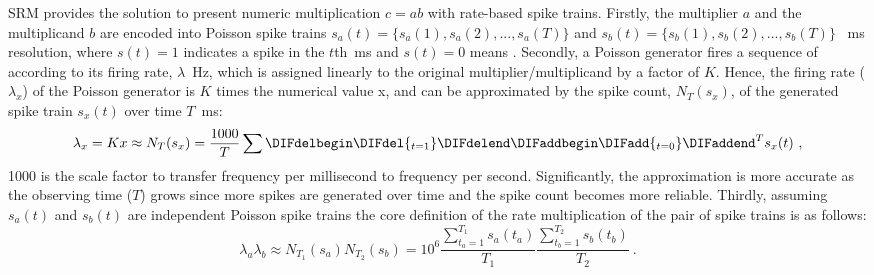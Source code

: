 SRM provides the solution to present numeric multiplication $c=ab$ with rate-based spike trains.
Firstly, the multiplier $a$ and the multiplicand $b$ are encoded into Poisson spike trains $s_a(t)=\{s_a(1),s_a(2),...,s_a(T)\}$ and $s_b(t)=\{s_b(1),s_b(2),...,s_b(T)\}$ \DIFdelbegin {}\DIFdelend \DIFaddbegin {}~ms resolution, where $s(t)=1$ indicates a spike in the $t$th~ms and $s(t)=0$ means \DIFdelbegin {}\DIFdelend \DIFaddbegin {}\DIFaddend .
Secondly, a Poisson generator fires a sequence of \DIFdelbegin {}\DIFdelend \DIFaddbegin {}\DIFaddend according to its firing rate, $\lambda$~Hz, which is assigned linearly to the original multiplier/multiplicand by a factor of $K$.
Hence, the firing rate ($\lambda_x$) of the Poisson generator is $K$ times the numerical value x, and can be approximated by the \DIFdelbegin {}\DIFdelend \DIFaddbegin {}\DIFaddend spike count, $N_T(s_x)$, of the generated spike train $s_x(t)$ over time \DIFdelbegin {}\DIFdelend $T$~ms:
\begin{equation}
\lambda_x = Kx \approx N_T(s_x) = \frac{1000}{T} \sum\DIFdelbegin \DIFdel{_{t=1}}\DIFdelend \DIFaddbegin \DIFadd{_{t=0}}\DIFaddend ^{T} s_x(t)~,
\end{equation} 
1000 is the scale factor to transfer frequency per millisecond to frequency per second.
Significantly, the approximation is more accurate as the observing time ($T$) grows since more spikes are generated over time and the \DIFdelbegin {}\DIFdelend \DIFaddbegin {}\DIFaddend spike count becomes more reliable.
Thirdly, assuming $s_a(t)$ and $s_b(t)$ are independent Poisson spike trains the core definition of the rate multiplication of the pair of spike trains is as follows:
\begin{equation}
\lambda_a \lambda_b \approx N_{T_1}(s_a)N_{T_2}(s_b)= 10^6 \frac{\sum_{t_a=1}^{T_1}s_a(t_a)}{T_1}  \frac{\sum_{t_b=1}^{T_2} s_b(t_b)}{T_2}~.
\label{equ:mul}
\end{equation} 

